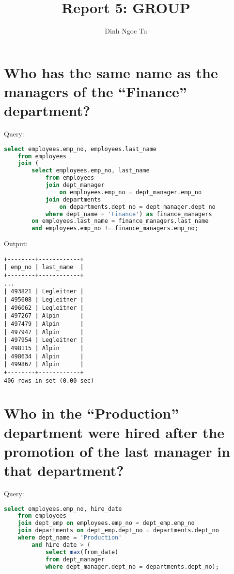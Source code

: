\documentclass[12pt]{article}
\title{Report 5: GROUP}
\author{Dinh Ngoc Tu}
\begin{document}
\maketitle


\section{Who has the same name as the managers of the ``Finance'' department?}

Query:

\begin{lstlisting}[language=SQL]
select employees.emp_no, employees.last_name
    from employees
    join (
        select employees.emp_no, last_name
            from employees
            join dept_manager
                on employees.emp_no = dept_manager.emp_no
            join departments
                on departments.dept_no = dept_manager.dept_no
            where dept_name = 'Finance') as finance_managers
        on employees.last_name = finance_managers.last_name
        and employees.emp_no != finance_managers.emp_no;
\end{lstlisting}

Output:

\begin{verbatim}
+--------+------------+
| emp_no | last_name  |
+--------+------------+
...
| 493821 | Legleitner |
| 495608 | Legleitner |
| 496062 | Legleitner |
| 497267 | Alpin      |
| 497479 | Alpin      |
| 497947 | Alpin      |
| 497954 | Legleitner |
| 498115 | Alpin      |
| 498634 | Alpin      |
| 499867 | Alpin      |
+--------+------------+
406 rows in set (0.00 sec)
\end{verbatim}


\section{Who in the ``Production'' department were hired after the promotion of the last manager in that department?}

Query:

\begin{lstlisting}[language=SQL]
select employees.emp_no, hire_date
    from employees
    join dept_emp on employees.emp_no = dept_emp.emp_no
    join departments on dept_emp.dept_no = departments.dept_no
    where dept_name = 'Production'
        and hire_date > (
            select max(from_date)
            from dept_manager
            where dept_manager.dept_no = departments.dept_no);
\end{lstlisting}
\end{document}

